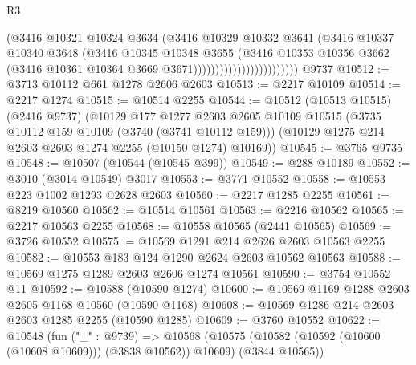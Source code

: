 \begin{lexlean}{R3}
\begin{coremodule}
                                        (@3416
                                          @10321
                                          @10324
                                          @3634
                                          (@3416
                                            @10329
                                            @10332
                                            @3641
                                            (@3416
                                              @10337
                                              @10340
                                              @3648
                                              (@3416
                                                @10345
                                                @10348
                                                @3655
                                                (@3416
                                                  @10353
                                                  @10356
                                                  @3662
                                                  (@3416
                                                    @10361
                                                    @10364
                                                    @3669
                                                    @3671))))))))))))))))))))))))
    @9737
@10512 := @3713 @10112 @661 @1278 @2606 @2603
@10513 := @2217 @10109
@10514 := @2217 @1274
@10515 := @10514 @2255
@10544 := @10512
    (@10513 @10515)
    (@2416 @9737)
    (@10129
      @177
      @1277
      @2603
      @2605
      @10109
      @10515
      (@3735 @10112 @159 @10109 (@3740 (@3741 @10112 @159)))
      (@10129 @1275 @214 @2603 @2603 @1274 @2255 (@10150 @1274) @10169))
@10545 := @3765 @9735
@10548 := @10507 (@10544 (@10545 @399))
@10549 := @288 @10189
@10552 := @3010 (@3014 @10549) @3017
@10553 := @3771 @10552
@10558 := @10553 @223 @1002 @1293 @2628 @2603
@10560 := @2217 @1285 @2255
@10561 := @8219 @10560
@10562 := @10514 @10561
@10563 := @2216 @10562
@10565 := @2217 @10563 @2255
@10568 := @10558 @10565 (@2441 @10565)
@10569 := @3726 @10552
@10575 := @10569 @1291 @214 @2626 @2603 @10563 @2255
@10582 := @10553 @183 @124 @1290 @2624 @2603 @10562 @10563
@10588 := @10569 @1275 @1289 @2603 @2606 @1274 @10561
@10590 := @3754 @10552 @11
@10592 := @10588 (@10590 @1274)
@10600 := @10569 @1169 @1288 @2603 @2605 @1168 @10560 (@10590 @1168)
@10608 := @10569 @1286 @214 @2603 @2603 @1285 @2255 (@10590 @1285)
@10609 := @3760 @10552
@10622 := @10548
    (fun ("_" : @9739) =>
    @10568 (@10575 (@10582 (@10592 (@10600 (@10608 @10609))) (@3838 @10562)) @10609) (@3844 @10565))

\end{coremodule}
\end{lexlean}
